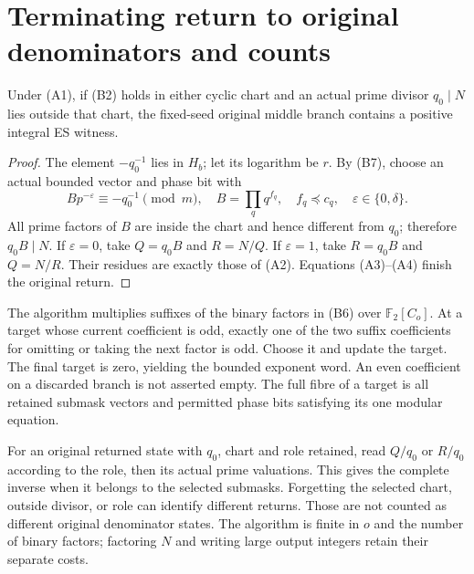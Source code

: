 \section{Terminating return to original denominators and counts}
\begin{theorem}\label{thm:return}
Under (A1), if (B2) holds in either cyclic chart and an actual prime divisor
$q_0\mid N$ lies outside that chart, the fixed-seed original middle branch
contains a positive integral ES witness.
\end{theorem}
\begin{proof}
The element $-q_0^{-1}$ lies in $H_b$; let its logarithm be $r$.
By (B7), choose an actual bounded vector and phase bit with
\[
 Bp^{-\varepsilon}\equiv-q_0^{-1}\pmod m,
 \quad B=\prod_q q^{f_q},\quad f_q\preceq c_q,
 \quad\varepsilon\in\{0,\delta\}.
\]
All prime factors of $B$ are inside the chart and hence different from $q_0$;
therefore $q_0B\mid N$. If $\varepsilon=0$, take $Q=q_0B$ and $R=N/Q$.
If $\varepsilon=1$, take $R=q_0B$ and $Q=N/R$. Their residues are exactly
those of (A2). Equations (A3)--(A4) finish the original return.
\end{proof}

The algorithm multiplies suffixes of the binary factors in (B6) over
$\mathbb F_2[C_o]$. At a target whose current coefficient is odd, exactly one
of the two suffix coefficients for omitting or taking the next factor is odd.
Choose it and update the target. The final target is zero, yielding the
bounded exponent word. An even coefficient on a discarded branch is not
asserted empty. The full fibre of a target is all retained submask vectors
and permitted phase bits satisfying its one modular equation.

For an original returned state with $q_0$, chart and role retained, read
$Q/q_0$ or $R/q_0$ according to the role, then its actual prime valuations.
This gives the complete inverse when it belongs to the selected submasks.
Forgetting the selected chart, outside divisor, or role can identify different
returns. Those are not counted as different original denominator states.
The algorithm is finite in $o$ and the number of binary factors; factoring
$N$ and writing large output integers retain their separate costs.

